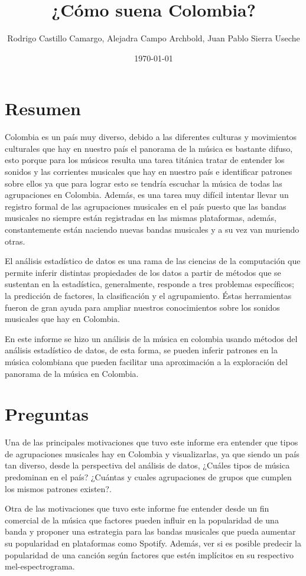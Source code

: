\documentclass[11pt]{article}
\author{Rodrigo Castillo Camargo, Alejadra Campo Archbold, Juan Pablo Sierra Useche}
\date{\today}
\title{¿Cómo suena Colombia?}
\begin{document}
\maketitle

\section{Resumen}
\label{sec:org19e358f}
Colombia es un país muy diverso, debido a las diferentes culturas y movimientos
culturales que hay en nuestro país el panorama de la música es bastante difuso,
esto porque para los músicos resulta una tarea titánica tratar de entender los
sonidos y las corrientes musicales que hay en nuestro país e identificar
patrones sobre ellos ya que para lograr esto se tendría escuchar la música de
todas las agrupaciones en Colombia. Además, es una tarea muy difícil intentar
llevar un registro formal de las agrupaciones musicales en el país puesto que
las bandas musicales no siempre están registradas en las mismas plataformas,
además, constantemente están naciendo nuevas bandas musicales y a su vez van
muriendo otras.

El análisis estadístico de datos es una rama de las ciencias de la computación
que permite inferir distintas propiedades de los datos a partir de métodos que
se sustentan en la estadística, generalmente, responde a tres problemas
específicos; la predicción  de factores, la clasificación y el agrupamiento.
Éstas herramientas fueron de gran ayuda para ampliar nuestros conocimientos
sobre los sonidos musicales que hay en Colombia.

En este informe se hizo un análisis de la música en colombia usando métodos del
análisis estadístico de datos, de esta forma, se pueden inferir patrones en la
música colombiana que pueden facilitar una aproximación a la exploración del
panorama de la música en Colombia.

\section{Preguntas}
\label{sec:orgc775fa8}
Una de las principales motivaciones que tuvo este informe era entender que tipos
de agrupaciones musicales hay en Colombia y visualizarlas, ya que siendo un país
tan diverso, desde la perspectiva del análisis de datos, ¿Cuáles tipos de
música predominan en el país? ¿Cuántas y cuales agrupaciones de grupos que
cumplen los mismos patrones existen?.

Otra de las motivaciones que tuvo este informe fue entender desde un fin
comercial de la música que factores pueden influir en la popularidad de una
banda y proponer una estrategia para las bandas musicales que pueda aumentar su
popularidad en plataformas como Spotify. Además, ver si es posible predecir la
popularidad de una canción según factores que estén implícitos en su respectivo
mel-espectrograma.
\end{document}
